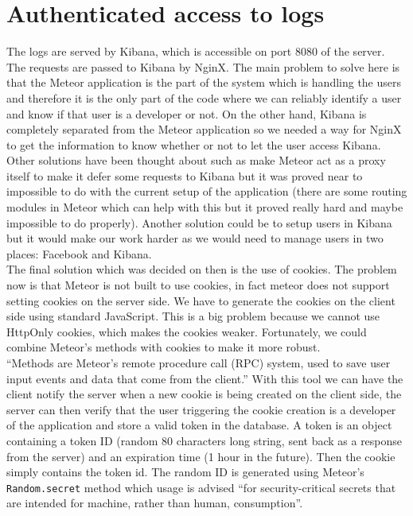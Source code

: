 \appendix
\chapter{Authenticated access to logs}\label{appendix:cookies}
The logs are served by Kibana, which is accessible on port 8080 of the server. The requests are passed to Kibana by NginX. The main problem to solve here is that the Meteor application is the part of the system which is handling the users and therefore it is the only part of the code where we can reliably identify a user and know if that user is a developer or not. On the other hand, Kibana is completely separated from the Meteor application so we needed a way for NginX to get the information to know whether or not to let the user access Kibana.\\
Other solutions have been thought about such as make Meteor act as a proxy itself to make it defer some requests to Kibana but it was proved near to impossible to do with the current setup of the application (there are some routing modules in Meteor which can help with this but it proved really hard and maybe impossible to do properly). Another solution could be to setup users in Kibana but it would make our work harder as we would need to manage users in two places: Facebook and Kibana.\\
The final solution which was decided on then is the use of cookies. The problem now is that Meteor is not built to use cookies, in fact meteor does not support setting cookies on the server side. We have to generate the cookies on the client side using standard JavaScript. This is a big problem because we cannot use HttpOnly cookies\cite{httponly}, which makes the cookies weaker. Fortunately, we could combine Meteor's methods with cookies to make it more robust.\\
``Methods are Meteor’s remote procedure call (RPC) system, used to save user input events and data that come from the client.'' \cite{methods} With this tool we can have the client notify the server when a new cookie is being created on the client side, the server can then verify that the user triggering the cookie creation is a developer of the application and store a valid token in the database. A token is an object containing a token ID (random 80 characters long string, sent back as a response from the server) and an expiration time (1 hour in the future). Then the cookie simply contains the token id. The random ID is generated using Meteor's \texttt{Random.secret} method which usage is advised ``for security-critical secrets that are intended for machine, rather than human, consumption''\cite{meteorrandom}.\\
